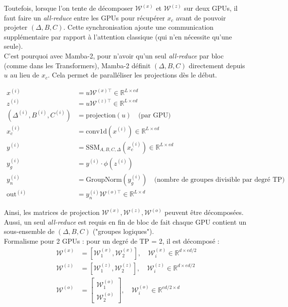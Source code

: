 Toutefois, lorsque l’on tente de décomposer $\mathcal{W}^{(x)}$ et $\mathcal{W}^{(z)}$ sur deux GPUs, il faut faire un \textit{all-reduce} entre les GPUs pour récupérer $x_c$ avant de pouvoir projeter $(\Delta, B, C)$. Cette synchronisation ajoute une communication supplémentaire par rapport à l’attention classique (qui n’en nécessite qu’une seule).\\

C’est pourquoi avec Mamba-2, pour n’avoir qu’un seul \textit{all-reduce} par bloc (comme dans les Transformers), Mamba-2 définit $(\Delta, B, C)$ directement depuis $u$ au lieu de $x_c$. Cela permet de paralléliser les projections dès le début.

\begin{align*}
    x^{(i)} &= u \mathcal{W}^{(x)\top} \in \mathbb{R}^{L \times ed} \\
    z^{(i)} &= u \mathcal{W}^{(z)\top} \in \mathbb{R}^{L \times ed} \\
    (\Delta^{(i)}, B^{(i)}, C^{(i)}) &= \text{projection}(u) \quad \text{(par GPU)} \\
    x^{(i)}_c &= \text{conv1d}(x^{(i)}) \in \mathbb{R}^{L \times ed} \\
    y^{(i)} &= \text{SSM}_{A,B,C,\Delta}(x_c^{(i)}) \in \mathbb{R}^{L \times ed} \\
    y^{(i)}_g &= y^{(i)} \cdot \phi(z^{(i)}) \\
    y^{(i)}_n &= \text{GroupNorm}(y_g^{(i)}) \quad \text{(nombre de groupes divisible par degré TP)} \\
    \text{out}^{(i)} &= y_n^{(i)} \mathcal{W}^{(o)\top} \in \mathbb{R}^{L \times d}
\end{align*}

Ainsi, les matrices de projection $\mathcal{W}^{(x)}, \mathcal{W}^{(z)}, \mathcal{W}^{(o)}$ peuvent être décomposées. Aussi, un seul \textit{all-reduce} est requis en fin de bloc de fait chaque GPU contient un sous-ensemble de $(\Delta, B, C)$ ("groupes logiques").\\

Formalisme pour 2 GPUs : pour un degré de TP = 2, il est décomposé :
\begin{align*}
    \mathcal{W}^{(x)} &= [\mathcal{W}^{(x)}_1, \mathcal{W}^{(x)}_2], \quad \mathcal{W}^{(x)}_i \in \mathbb{R}^{d \times ed/2} \\
    \mathcal{W}^{(z)} &= [\mathcal{W}^{(z)}_1, \mathcal{W}^{(z)}_2], \quad \mathcal{W}^{(z)}_i \in \mathbb{R}^{d \times ed/2} \\
    \mathcal{W}^{(o)} &= \begin{bmatrix} \mathcal{W}^{(o)}_1 \\ \mathcal{W}^{(o)}_2 \end{bmatrix}, \quad \mathcal{W}^{(o)}_i \in \mathbb{R}^{ed/2 \times d}
\end{align*}

